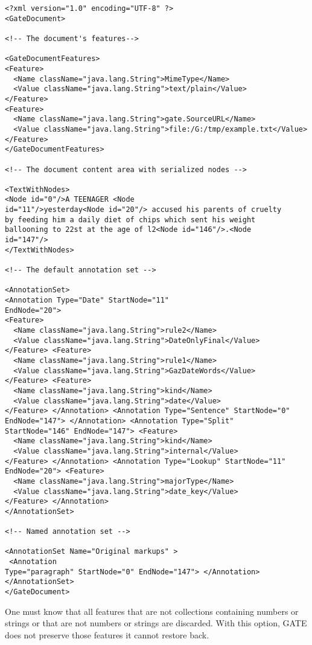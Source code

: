\small
\begin{small}
\begin{verbatim}
<?xml version="1.0" encoding="UTF-8" ?>
<GateDocument>

<!-- The document's features-->

<GateDocumentFeatures>
<Feature>
  <Name className="java.lang.String">MimeType</Name>
  <Value className="java.lang.String">text/plain</Value>
</Feature>
<Feature>
  <Name className="java.lang.String">gate.SourceURL</Name>
  <Value className="java.lang.String">file:/G:/tmp/example.txt</Value>
</Feature>
</GateDocumentFeatures>

<!-- The document content area with serialized nodes -->

<TextWithNodes>
<Node id="0"/>A TEENAGER <Node
id="11"/>yesterday<Node id="20"/> accused his parents of cruelty
by feeding him a daily diet of chips which sent his weight
ballooning to 22st at the age of l2<Node id="146"/>.<Node
id="147"/>
</TextWithNodes>

<!-- The default annotation set -->

<AnnotationSet>
<Annotation Type="Date" StartNode="11"
EndNode="20">
<Feature>
  <Name className="java.lang.String">rule2</Name>
  <Value className="java.lang.String">DateOnlyFinal</Value>
</Feature> <Feature>
  <Name className="java.lang.String">rule1</Name>
  <Value className="java.lang.String">GazDateWords</Value>
</Feature> <Feature>
  <Name className="java.lang.String">kind</Name>
  <Value className="java.lang.String">date</Value>
</Feature> </Annotation> <Annotation Type="Sentence" StartNode="0"
EndNode="147"> </Annotation> <Annotation Type="Split"
StartNode="146" EndNode="147"> <Feature>
  <Name className="java.lang.String">kind</Name>
  <Value className="java.lang.String">internal</Value>
</Feature> </Annotation> <Annotation Type="Lookup" StartNode="11"
EndNode="20"> <Feature>
  <Name className="java.lang.String">majorType</Name>
  <Value className="java.lang.String">date_key</Value>
</Feature> </Annotation>
</AnnotationSet>

<!-- Named annotation set -->

<AnnotationSet Name="Original markups" >
 <Annotation
Type="paragraph" StartNode="0" EndNode="147"> </Annotation>
</AnnotationSet>
</GateDocument>
\end{verbatim}
\end{small}
\nnormalsize

 One must know that all features that are not
collections containing numbers or strings or that are not numbers
or strings are discarded. With this option, GATE does not preserve
those features it cannot restore back.

